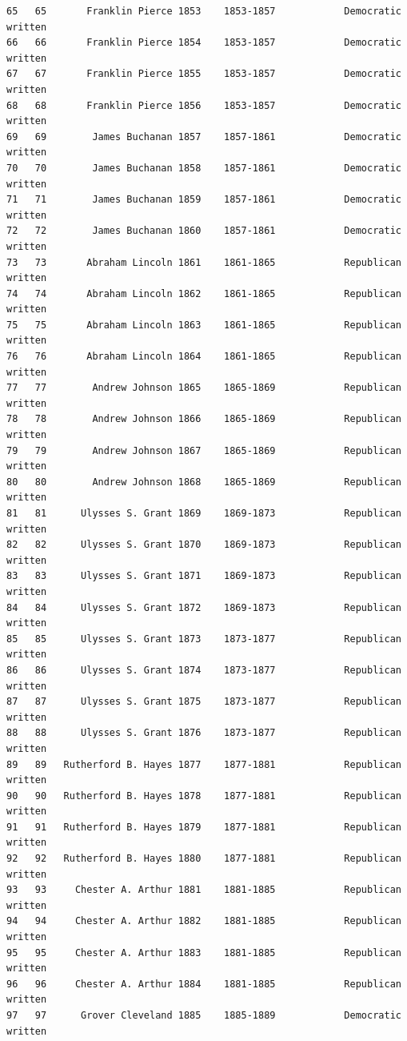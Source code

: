 \documentclass[
  letterpaper,
  DIV=11,
  numbers=noendperiod]{scrreprt}
\begin{document}
\begin{verbatim}
65   65       Franklin Pierce 1853    1853-1857            Democratic   written
66   66       Franklin Pierce 1854    1853-1857            Democratic   written
67   67       Franklin Pierce 1855    1853-1857            Democratic   written
68   68       Franklin Pierce 1856    1853-1857            Democratic   written
69   69        James Buchanan 1857    1857-1861            Democratic   written
70   70        James Buchanan 1858    1857-1861            Democratic   written
71   71        James Buchanan 1859    1857-1861            Democratic   written
72   72        James Buchanan 1860    1857-1861            Democratic   written
73   73       Abraham Lincoln 1861    1861-1865            Republican   written
74   74       Abraham Lincoln 1862    1861-1865            Republican   written
75   75       Abraham Lincoln 1863    1861-1865            Republican   written
76   76       Abraham Lincoln 1864    1861-1865            Republican   written
77   77        Andrew Johnson 1865    1865-1869            Republican   written
78   78        Andrew Johnson 1866    1865-1869            Republican   written
79   79        Andrew Johnson 1867    1865-1869            Republican   written
80   80        Andrew Johnson 1868    1865-1869            Republican   written
81   81      Ulysses S. Grant 1869    1869-1873            Republican   written
82   82      Ulysses S. Grant 1870    1869-1873            Republican   written
83   83      Ulysses S. Grant 1871    1869-1873            Republican   written
84   84      Ulysses S. Grant 1872    1869-1873            Republican   written
85   85      Ulysses S. Grant 1873    1873-1877            Republican   written
86   86      Ulysses S. Grant 1874    1873-1877            Republican   written
87   87      Ulysses S. Grant 1875    1873-1877            Republican   written
88   88      Ulysses S. Grant 1876    1873-1877            Republican   written
89   89   Rutherford B. Hayes 1877    1877-1881            Republican   written
90   90   Rutherford B. Hayes 1878    1877-1881            Republican   written
91   91   Rutherford B. Hayes 1879    1877-1881            Republican   written
92   92   Rutherford B. Hayes 1880    1877-1881            Republican   written
93   93     Chester A. Arthur 1881    1881-1885            Republican   written
94   94     Chester A. Arthur 1882    1881-1885            Republican   written
95   95     Chester A. Arthur 1883    1881-1885            Republican   written
96   96     Chester A. Arthur 1884    1881-1885            Republican   written
97   97      Grover Cleveland 1885    1885-1889            Democratic   written

\end{verbatim}
\end{document}
